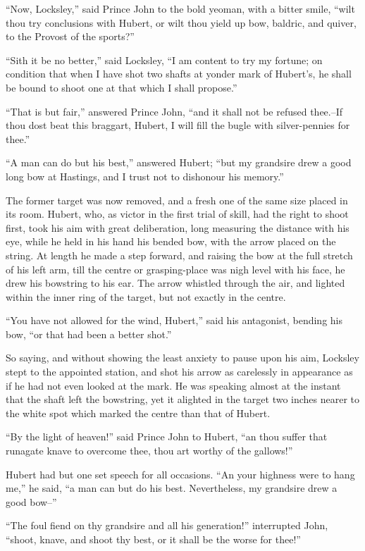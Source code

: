 ``Now, Locksley,'' said Prince John to the bold yeoman, with a bitter
smile, ``wilt thou try conclusions with Hubert, or wilt thou yield up
bow, baldric, and quiver, to the Provost of the sports?''

``Sith it be no better,'' said Locksley, ``I am content to try my
fortune; on condition that when I have shot two shafts at yonder mark of
Hubert's, he shall be bound to shoot one at that which I shall
propose.''

``That is but fair,'' answered Prince John, ``and it shall not be
refused thee.--If thou dost beat this braggart, Hubert, I will fill the
bugle with silver-pennies for thee.''

``A man can do but his best,'' answered Hubert; ``but my grandsire drew
a good long bow at Hastings, and I trust not to dishonour his memory.''

The former target was now removed, and a fresh one of the same size
placed in its room. Hubert, who, as victor in the first trial of skill,
had the right to shoot first, took his aim with great deliberation, long
measuring the distance with his eye, while he held in his hand his
bended bow, with the arrow placed on the string. At length he made a
step forward, and raising the bow at the full stretch of his left arm,
till the centre or grasping-place was nigh level with his face, he drew
his bowstring to his ear. The arrow whistled through the air, and
lighted within the inner ring of the target, but not exactly in the
centre.

``You have not allowed for the wind, Hubert,'' said his antagonist,
bending his bow, ``or that had been a better shot.''

So saying, and without showing the least anxiety to pause upon his aim,
Locksley stept to the appointed station, and shot his arrow as
carelessly in appearance as if he had not even looked at the mark. He
was speaking almost at the instant that the shaft left the bowstring,
yet it alighted in the target two inches nearer to the white spot which
marked the centre than that of Hubert.

``By the light of heaven!'' said Prince John to Hubert, ``an thou suffer
that runagate knave to overcome thee, thou art worthy of the gallows!''

Hubert had but one set speech for all occasions. ``An your highness were
to hang me,'' he said, ``a man can but do his best. Nevertheless, my
grandsire drew a good bow--''

``The foul fiend on thy grandsire and all his generation!'' interrupted
John, ``shoot, knave, and shoot thy best, or it shall be the worse for
thee!''

